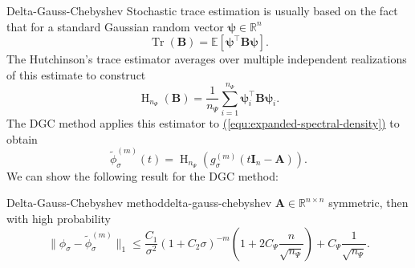 \documentclass[final, 12pt]{beamer}
\newcommand{\mtx}[1]{\boldsymbol{#1}}
\newcommand{\vct}[1]{\boldsymbol{#1}}
\DeclareMathOperator{\Tr}{Tr}
\DeclareMathOperator{\Hutch}{H}
\newcommand{\refequ}[1]{\hyperref[#1]{\textcolor{linkcolor}{(\ref*{#1})}}}
\begin{document}
\begin{frame}[t]

\vspace{15pt}
\begin{columns}[t]

    \begin{column}{0.3\paperwidth}

        \begin{block}{Delta-Gauss-Chebyshev}
            Stochastic trace estimation is usually based on the fact that
            for a standard Gaussian random vector $\vct{\psi} \in \mathbb{R}^n$
            \begin{equation}
                \Tr(\mtx{B}) = \mathbb{E}\left[\vct{\psi}^{\top} \mtx{B} \vct{\psi}\right].
            \end{equation}
            The Hutchinson's trace estimator averages over multiple independent
            realizations of this estimate to construct
            \begin{equation}
                \Hutch_{n_{\Psi}}(\mtx{B}) = \frac{1}{n_{\Psi}} \sum_{i=1}^{n_{\Psi}} \vct{\psi}_i^{\top} \mtx{B} \vct{\psi}_i.
            \end{equation}
            The \gls{DGC} method \cite{lin2017randomized} applies this
            estimator to \refequ{equ:expanded-spectral-density} to obtain
            \begin{equation}
                \boxed{\widetilde{\phi}_{\sigma}^{(m)}(t) = \Hutch_{n_{\Psi}}(g_{\sigma}^{(m)}(t\mtx{I}_n - \mtx{A})).}
            \end{equation}
            We can show the following result for the \gls{DGC} method:
            \begin{thm}{Delta-Gauss-Chebyshev method}{delta-gauss-chebyshev}
                $\mtx{A} \in \mathbb{R}^{n \times n}$ symmetric, then with high probability
                \begin{equation}
                    \lVert \phi_{\sigma} - \widetilde{\phi}_{\sigma}^{(m)}\rVert _1
                    \leq \frac{C_1}{\sigma^2} (1 + C_2 \sigma)^{-m} \left( 1 + 2 C_{\Psi} \frac{n}{\sqrt{n_{\Psi}}} \right) + C_{\Psi} \frac{1}{\sqrt{n_{\Psi}}}.
                \end{equation}
            \end{thm}
        \end{block}

    \end{column}


\end{columns}
\end{frame}
\end{document}
